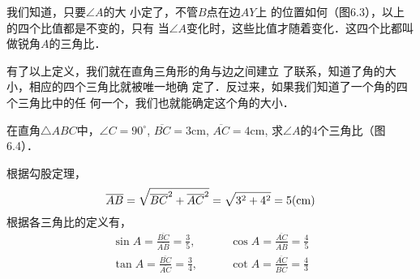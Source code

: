 我们知道，只要$\angle A$的大
小定了，不管$B$点在边$AY$上
的位置如何（图6.3），以上
的四个比值都是不变的，只有
当$\angle A$变化时，这些比值才随着变化．这四个比都叫做锐角$A$的三角比．

有了以上定义，我们就在直角三角形的角与边之间建立
了联系，知道了角的大小，相应的四个三角比就被唯一地确
定了．反过来，如果我们知道了一个角的四个三角比中的任
何一个，我们也就能确定这个角的大小．

\begin{example}
    在直角$\triangle ABC$中，$\angle C=90^{\circ}$, $\overline{BC}=3$cm, $\overline{AC}=
    4$cm, 求$\angle A$的4个三角比（图6.4）．
\end{example}

\begin{figure}[htp]\centering
    \begin{minipage}[t]{0.48\textwidth}
    \centering
{}
    \caption{}
    \end{minipage}
    \begin{minipage}[t]{0.48\textwidth}
    \centering
    \caption{}
    \end{minipage}
    \end{figure}

\begin{solution}
    根据勾股定理，
  \[  \overline{AB}=\sqrt{\overline{BC}^2+\overline{AC}^2}=\sqrt{3^2+4^2}=5{\rm (cm)}\]
  根据各三角比的定义有，
\[\begin{split}
    \sin A=\frac{\overline{BC}}{\overline{AB}}=\frac{3}{5},&\qquad \cos A=\frac{\overline{AC}}{\overline{AB}}=\frac{4}{5}\\
    \tan A=\frac{\overline{BC}}{\overline{AC}}=\frac{3}{4},&\qquad \cot A=\frac{\overline{AC}}{\overline{BC}}=\frac{4}{3}\\
\end{split}\]
\end{solution}



